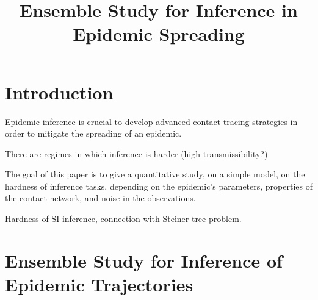 \documentclass[a4paper, amsfonts, amssymb, amsmath, reprint, showkeys, nofootinbib, twoside, floatfix, pre,superscriptaddress]{revtex4-2}
\begin{document}
\title{Ensemble Study for Inference in Epidemic Spreading}

\maketitle

\section{Introduction}
Epidemic inference is crucial to develop advanced contact tracing strategies in order to mitigate the spreading of an epidemic.

There are regimes in which inference is harder (high transmissibility?)

The goal of this paper is to give a quantitative study, on a simple model, on the hardness of inference tasks, depending on the epidemic's parameters, properties of the contact network, and noise in the observations.

Hardness of SI inference, connection with Steiner tree problem.

\section{Ensemble Study for Inference of Epidemic Trajectories}
\end{document}
